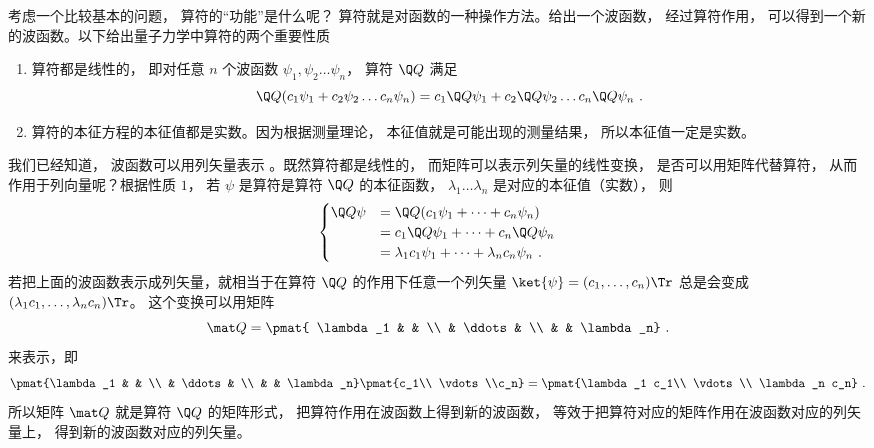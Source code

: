 
\begin{issues}
\issueMissDepend
{}
\end{issues}


考虑一个比较基本的问题， 算符的“功能”是什么呢？ 算符就是对函数的一种操作方法。给出一个波函数， 经过算符作用， 可以得到一个新的波函数。以下给出量子力学中算符的两个重要性质
\begin{enumerate}
\item 算符都是线性的， 即对任意 $n$ 个波函数 $\psi_1, \psi_2 \dots \psi_n$，  算符 $\Q Q$ 满足
\begin{equation}
\Q Q (c_1 \psi_1 + c_2 \psi_2 \dots c_n \psi_n) = c_1\Q Q \psi_1 + c_2 \Q Q \psi_2 \dots c_n \Q Q \psi_n~.
\end{equation}
\item 算符的本征方程的本征值都是实数。因为根据测量理论， 本征值就是可能出现的测量结果， 所以本征值一定是实数。
\end{enumerate}

我们已经知道， 波函数可以用列矢量表示%
。既然算符都是线性的， 而矩阵可以表示列矢量的线性变换， 是否可以用矩阵代替算符， 从而作用于列向量呢？根据性质 $1$，  若 $\psi$ 是算符是算符 $\Q Q$ 的本征函数， $\lambda_1 \dots \lambda_n$ 是对应的本征值（实数）， 则
\begin{equation}
\begin{cases}
\Q Q  \psi & = \Q Q(c_1 \psi_1 + \dots + c_n \psi_n)\\
& = c_1 \Q Q \psi_1 + \dots + c_n \Q Q \psi_n\\
& = \lambda_1 c_1 \psi_1 + \dots + \lambda_n c_n \psi_n~.
\end{cases}
\end{equation}
若把上面的波函数表示成列矢量，就相当于在算符 $\Q Q$ 的作用下任意一个列矢量 $\ket{\psi}  = (c_1, \dots, c_n)\Tr$ 总是会变成 $(\lambda_1 c_1, \dots, \lambda_n c_n)\Tr$。 这个变换可以用矩阵
\begin{equation}
\mat Q = \pmat{
\lambda_1 &  & \\
 & \ddots & \\
& & \lambda_n}~.
\end{equation}
来表示，即
\begin{equation}
\pmat{\lambda_1 & & \\ & \ddots & \\  & & \lambda_n}
\pmat{c_1\\ \vdots \\c_n} 
= \pmat{\lambda_1 c_1\\  \vdots \\ \lambda_n c_n}~.
\end{equation}
所以矩阵 $\mat Q$ 就是算符 $\Q Q$ 的矩阵形式， 把算符作用在波函数上得到新的波函数， 等效于把算符对应的矩阵作用在波函数对应的列矢量上， 得到新的波函数对应的列矢量。

